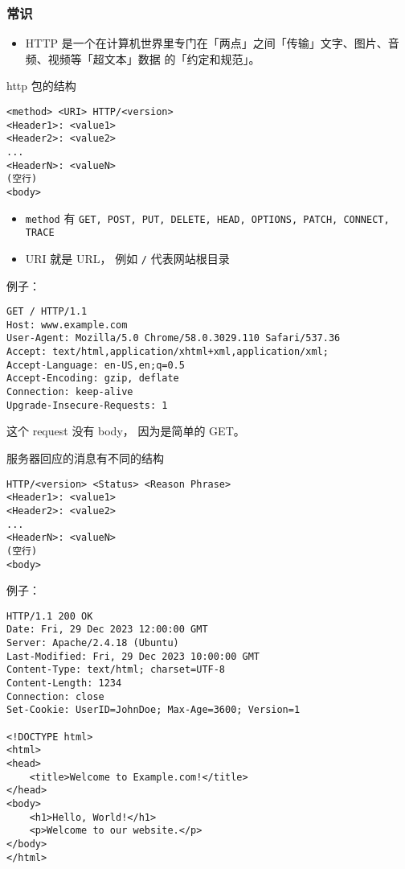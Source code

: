 
\begin{issues}
\issueDraft
\end{issues}

\subsubsection{常识}
\begin{itemize}
\item HTTP 是一个在计算机世界里专门在「两点」之间「传输」文字、图片、音频、视频等「超文本」数据 的「约定和规范」。
\end{itemize}


http 包的结构
\begin{lstlisting}[language=none]
<method> <URI> HTTP/<version>
<Header1>: <value1>
<Header2>: <value2>
...
<HeaderN>: <valueN>
(空行)
<body>
\end{lstlisting}

\begin{itemize}
\item \verb|method| 有 \verb|GET, POST, PUT, DELETE, HEAD, OPTIONS, PATCH, CONNECT, TRACE|
\item URI 就是 URL， 例如 \verb`/` 代表网站根目录
\end{itemize}

例子：
\begin{lstlisting}[language=none]
GET / HTTP/1.1
Host: www.example.com
User-Agent: Mozilla/5.0 Chrome/58.0.3029.110 Safari/537.36
Accept: text/html,application/xhtml+xml,application/xml;
Accept-Language: en-US,en;q=0.5
Accept-Encoding: gzip, deflate
Connection: keep-alive
Upgrade-Insecure-Requests: 1
\end{lstlisting}
这个 request 没有 body， 因为是简单的 GET。

服务器回应的消息有不同的结构
\begin{lstlisting}[language=none]
HTTP/<version> <Status> <Reason Phrase>
<Header1>: <value1>
<Header2>: <value2>
...
<HeaderN>: <valueN>
(空行)
<body>
\end{lstlisting}

例子：
\begin{lstlisting}[language=none]
HTTP/1.1 200 OK
Date: Fri, 29 Dec 2023 12:00:00 GMT
Server: Apache/2.4.18 (Ubuntu)
Last-Modified: Fri, 29 Dec 2023 10:00:00 GMT
Content-Type: text/html; charset=UTF-8
Content-Length: 1234
Connection: close
Set-Cookie: UserID=JohnDoe; Max-Age=3600; Version=1

<!DOCTYPE html>
<html>
<head>
    <title>Welcome to Example.com!</title>
</head>
<body>
    <h1>Hello, World!</h1>
    <p>Welcome to our website.</p>
</body>
</html>
\end{lstlisting}

